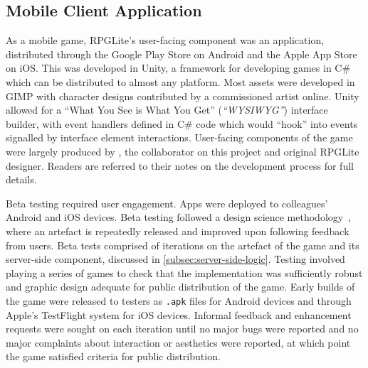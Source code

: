 \subsection{Mobile Client Application}
\label{rpglite_mobile_app}

As a mobile game, RPGLite's user-facing component was an application,
distributed through the Google Play Store on Android and the Apple App Store on
iOS. This was developed in Unity, a framework for developing games in C\# which
can be distributed to almost any platform. Most assets were developed in GIMP
with character designs contributed by a commissioned artist online. Unity
allowed for a ``What You See is What You Get'' (\emph{``WYSIWYG''}) interface
builder, with event handlers defined in C\# code which would ``hook'' into
events signalled by interface element interactions. User-facing components of
the game were largely produced by \citet{kavanagh2021thesis}, the collaborator
on this project and original RPGLite designer. Readers are referred to their
notes on the development process for full details.

Beta testing required user engagement. Apps were deployed to colleagues' Android
and iOS devices. Beta testing followed a design science
methodology~\cite{johannesson2014introduction}, where an artefact is repeatedly
released and improved upon following feedback from users. Beta tests comprised
of iterations on the artefact of the game and its server-side component,
discussed in \cref{subsec:server-side-logic}. Testing involved playing a series
of games to check that the implementation was sufficiently robust and graphic
design adequate for public distribution of the game. Early builds of the game
were released to testers as \lstinline{.apk} files for Android devices and
through Apple's TestFlight system for iOS devices. Informal feedback and
enhancement requests were sought on each iteration until no major bugs were
reported and no major complaints about interaction or aesthetics were reported,
at which point the game satisfied criteria for public distribution.


